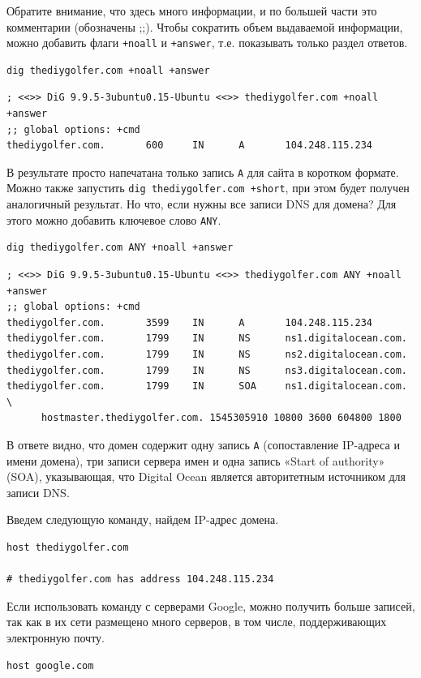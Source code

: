 \documentclass[a4paper,12pt,final,openany]{extbook}
\begin{document}
Обратите внимание, что здесь много информации, и по большей части это
комментарии (обозначены ;;). Чтобы сократить объем выдаваемой информации, можно добавить
флаги \texttt{+noall} и \texttt{+answer}, т.е. показывать только раздел
ответов.
\begin{verbatim}
dig thediygolfer.com +noall +answer
\end{verbatim}

\begin{verbatim}
; <<>> DiG 9.9.5-3ubuntu0.15-Ubuntu <<>> thediygolfer.com +noall +answer
;; global options: +cmd
thediygolfer.com.       600     IN      A       104.248.115.234
\end{verbatim}

В результате просто напечатана только запись \texttt{A} для сайта в коротком формате. Можно также запустить \texttt{dig\ thediygolfer.com\ +short},
при этом будет получен аналогичный результат. Но что, если нужны все
записи DNS для домена? Для этого можно добавить ключевое слово \texttt{ANY}.
\begin{verbatim}
dig thediygolfer.com ANY +noall +answer
\end{verbatim}

\begin{verbatim}
; <<>> DiG 9.9.5-3ubuntu0.15-Ubuntu <<>> thediygolfer.com ANY +noall +answer
;; global options: +cmd
thediygolfer.com.       3599    IN      A       104.248.115.234
thediygolfer.com.       1799    IN      NS      ns1.digitalocean.com.
thediygolfer.com.       1799    IN      NS      ns2.digitalocean.com.
thediygolfer.com.       1799    IN      NS      ns3.digitalocean.com.
thediygolfer.com.       1799    IN      SOA     ns1.digitalocean.com. \
      hostmaster.thediygolfer.com. 1545305910 10800 3600 604800 1800
\end{verbatim}

В ответе видно, что домен содержит одну запись \texttt{A} (сопоставление
IP-адреса и имени домена), три записи сервера имен и одна запись «Start
of authority» (SOA), указывающая, что Digital Ocean является
авторитетным источником для записи DNS.

Введем следующую команду, найдем IP-адрес домена.
\begin{verbatim}
host thediygolfer.com

# thediygolfer.com has address 104.248.115.234
\end{verbatim}

Если использовать команду с серверами Google, можно получить больше
записей, так как в их сети размещено много серверов, в том числе,
поддерживающих электронную почту.
\begin{verbatim}
host google.com
\end{verbatim}
\end{document}
